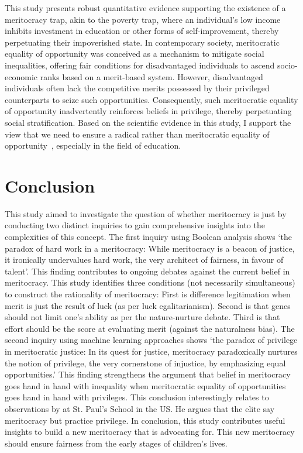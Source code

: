 This study presents robust quantitative evidence supporting the existence of a meritocracy trap, akin to the poverty trap, where an individual's low income inhibits investment in education or other forms of self-improvement, thereby perpetuating their impoverished state. In contemporary society, meritocratic equality of opportunity was conceived as a mechanism to mitigate social inequalities, offering fair conditions for disadvantaged individuals to ascend socio-economic ranks based on a merit-based system. However, disadvantaged individuals often lack the competitive merits possessed by their privileged counterparts to seize such opportunities. Consequently, such meritocratic equality of opportunity inadvertently reinforces beliefs in privilege, thereby perpetuating social stratification. Based on the scientific evidence in this study, I support the view that we need to ensure a radical rather than meritocratic equality of opportunity~\citep{segall2013equality}, especially in the field of education.

\section{Conclusion}

This study aimed to investigate the question of whether meritocracy is just by conducting two distinct inquiries to gain comprehensive insights into the complexities of this concept. The first inquiry using Boolean analysis shows ‘the paradox of hard work in a meritocracy: While meritocracy is a beacon of justice, it ironically undervalues hard work, the very architect of fairness, in favour of talent’. This finding contributes to ongoing debates against the current belief in meritocracy. This study identifies three conditions (not necessarily simultaneous) to construct the rationality of meritocracy: First is difference legitimation when merit is just the result of luck (as per luck egalitarianism). Second is that genes should not limit one’s ability as per the nature-nurture debate. Third is that effort should be the score at evaluating merit (against the naturalness bias). The second inquiry using machine learning approaches shows ‘the paradox of privilege in meritocratic justice: In its quest for justice, meritocracy paradoxically nurtures the notion of privilege, the very cornerstone of injustice, by emphasizing equal opportunities.’ This finding strengthens the argument that belief in meritocracy goes hand in hand with inequality when meritocratic equality of opportunities goes hand in hand with privileges. This conclusion interestingly relates to observations by \citet{khan2013saying} at St. Paul’s School in the US. He argues that the elite say meritocracy but practice privilege. In conclusion, this study contributes useful insights to build a new meritocracy that \citet{tavsner2022time} is advocating for. This new meritocracy should ensure fairness from the early stages of children's lives.

